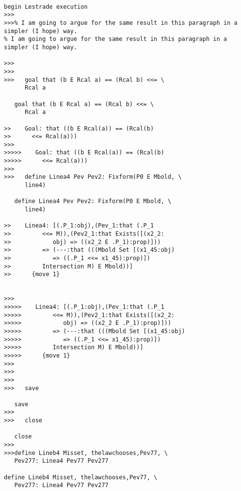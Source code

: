 \documentclass[12pt]{article}
\begin{document}
\begin{verbatim}

begin Lestrade execution
>>>
>>>% I am going to argue for the same result in this paragraph in a simpler (I hope) way.
% I am going to argue for the same result in this paragraph in a simpler (I hope) way.

>>>
>>>
>>>   goal that (b E Rcal a) == (Rcal b) <<= \
      Rcal a

   goal that (b E Rcal a) == (Rcal b) <<= \
      Rcal a

>>    Goal: that ((b E Rcal(a)) == (Rcal(b)
>>      <<= Rcal(a)))
>>>
>>>>>    Goal: that ((b E Rcal(a)) == (Rcal(b)
>>>>>      <<= Rcal(a)))
>>>
>>>   define Linea4 Pev Pev2: Fixform(P0 E Mbold, \
      line4)

   define Linea4 Pev Pev2: Fixform(P0 E Mbold, \
      line4)

>>    Linea4: [(.P_1:obj),(Pev_1:that (.P_1
>>         <<= M)),(Pev2_1:that Exists([(x2_2:
>>            obj) => ((x2_2 E .P_1):prop)]))
>>         => (---:that (((Mbold Set [(x1_45:obj)
>>            => ((.P_1 <<= x1_45):prop)])
>>         Intersection M) E Mbold))]
>>      {move 1}


>>>
>>>>>    Linea4: [(.P_1:obj),(Pev_1:that (.P_1
>>>>>         <<= M)),(Pev2_1:that Exists([(x2_2:
>>>>>            obj) => ((x2_2 E .P_1):prop)]))
>>>>>         => (---:that (((Mbold Set [(x1_45:obj)
>>>>>            => ((.P_1 <<= x1_45):prop)])
>>>>>         Intersection M) E Mbold))]
>>>>>      {move 1}
>>>
>>>
>>>
>>>   save

   save
>>>
>>>   close

   close
>>>
>>>define Lineb4 Misset, thelawchooses,Pev77, \
   Pev277: Linea4 Pev77 Pev277

define Lineb4 Misset, thelawchooses,Pev77, \
   Pev277: Linea4 Pev77 Pev277


\end{verbatim}
\end{document}
